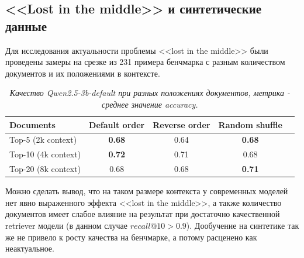 \newpage

\subsection{<<Lost in the middle>> и синтетические данные}
\label{subsec:synth_results} 

Для исследования актуальности проблемы <<lost in the middle>> были проведены замеры на срезке из 231 примера бенчмарка с разным количеством документов и их положениями в контексте.

\begin{table}[h]
\centering
\caption{\textit{Качество Qwen2.5-3b-default при разных положениях документов, метрика - среднее значение accuracy.}}
\renewcommand{\arraystretch}{1.0}  %
\begin{tabular}{@{}lcccc@{}}
\toprule
\textbf{Documents} & \textbf{Default order} & \textbf{Reverse order} & \textbf{Random shuffle}\\
\midrule
Top-5 (2k context)       & \textbf{0.68}     & 0.64       & \textbf{0.68}                \\
Top-10 (4k context)         & \textbf{0.72}     & 0.71       & 0.68                \\
Top-20 (8k context)        & 0.68              & 0.68       & \textbf{0.71}       \\
\bottomrule
\end{tabular}
\end{table}

Можно сделать вывод, что на таком размере контекста у современных моделей нет явно выраженного эффекта <<lost in the middle>>, а также количество документов имеет слабое влияние на результат при достаточно качественной retriever модели (в данном случае $recall@10 > 0.9$). Дообучение на синтетике так же не привело к росту качества на бенчмарке, а потому расценено как неактуальное.

\newpage
